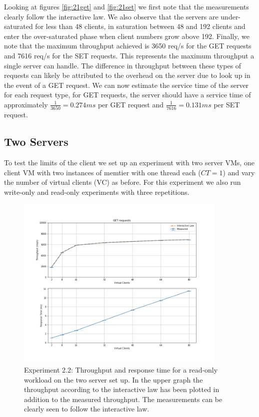 \documentclass[11pt,a4paper]{article}
\begin{document}
Looking at figures \ref{fig:21get} and \ref{fig:21set} we first note that the measurements clearly follow the interactive law. We also observe that the servers are under-saturated for less than 48 clients, in saturation between 48 and 192 clients and enter the over-saturated phase when client numbers grow above 192. Finally, we note that the maximum throughput achieved is 3650 req/s for the GET requests and 7616 req/s for the SET requests. This represents the maximum throughput a single server can handle. The difference in throughput between these types of requests can likely be attributed to the overhead on the server due to look up in the event of a GET request. We can now estimate the service time of the server for each request type, for GET requests, the server should have a service time of approximately $\frac{1}{3650} = 0.274 ms$ per GET request and $\frac{1}{7616 } = 0.131 ms$ per SET request. 


\subsection{Two Servers}

To test the limits of the client we set up an experiment with two server VMs, one client VM with two instances of memtier with one thread each ($CT=1$) and vary the number of virtual clients (VC) as before. For this experiment we also run write-only and read-only experiments with three repetitions.

\begin{figure}[h]
\centering
\includegraphics[width=0.9\textwidth]{22/22_get_requests}
\caption{Experiment 2.2: Throughput and response time for a read-only workload on the two server set up. In the upper graph the throughput according to the interactive law has been plotted in addition to the measured throughput. The measurements can be clearly seen to follow the interactive law.}
\label{fig:22get}
\end{figure}
\end{document}
